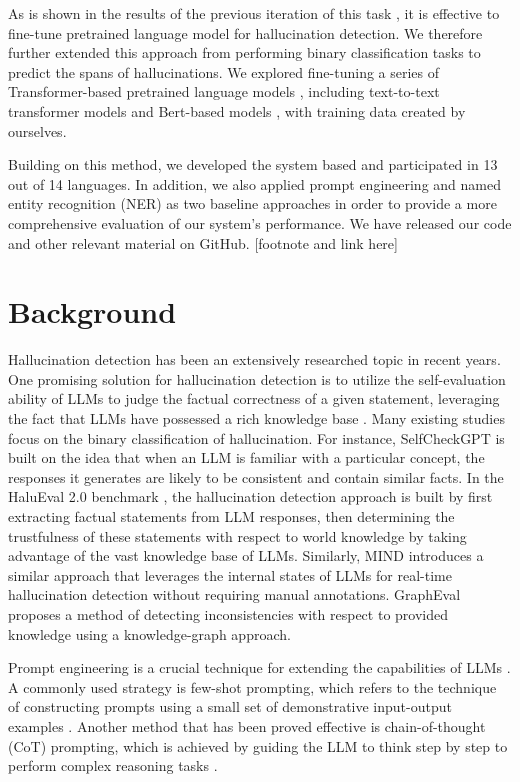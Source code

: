 \documentclass[11pt]{article}
\begin{document}
As is shown in the results of the previous iteration of this task \cite{mickus2024semeval}, it is effective to fine-tune pretrained language model for hallucination detection. We therefore further extended this approach from performing binary classification tasks to predict the spans of hallucinations. We explored fine-tuning a series of Transformer-based pretrained language models \cite{vaswani2017attention}, including text-to-text transformer models \cite{raffel2020exploring} and Bert-based models \cite{devlin2018bert}, with training data created by ourselves. 

Building on this method, we developed the system based and participated in 13 out of 14 languages. In addition, we also applied prompt engineering and named entity recognition (NER) as two baseline approaches in order to provide a more comprehensive evaluation of our system's performance. We have released our code and other relevant material on GitHub. 
[footnote and link here]


\section{Background}
Hallucination detection has been an extensively researched topic in recent years. One promising solution for hallucination detection is to utilize the self-evaluation ability of LLMs to judge the factual correctness of a given statement, leveraging the fact that LLMs have possessed a rich knowledge base \cite{li2024dawn, zhang2024self}. Many existing studies focus on the binary classification of hallucination. For instance, SelfCheckGPT \cite{manakul2023selfcheckgpt} is built on the idea that when an LLM is familiar with a particular concept, the responses it generates are likely to be consistent and contain similar facts. In the HaluEval 2.0 benchmark \cite{li2024dawn}, the hallucination detection approach is built by first extracting factual statements from LLM responses, then determining the trustfulness of these statements with respect to world knowledge by taking advantage of the vast knowledge base of LLMs. Similarly, MIND \cite{su2024unsupervised} introduces a similar approach that leverages the internal states of LLMs for real-time hallucination detection without requiring manual annotations. GraphEval \cite{sansford2024grapheval} proposes a method of detecting inconsistencies with respect to provided knowledge using a knowledge-graph approach.

Prompt engineering is a crucial technique for extending the capabilities of LLMs \cite{sahoo2024systematic}. A commonly used strategy is few-shot prompting, which refers to the technique of constructing prompts using a small set of demonstrative input-output examples \cite{lazaridou2022internet, ma2023fairness}. Another method that has been proved effective is chain-of-thought (CoT) prompting, which is achieved by guiding the LLM to think step by step to perform complex reasoning tasks \cite{wei2022chain, zhang2022automatic, chen2023you}.
\end{document}

